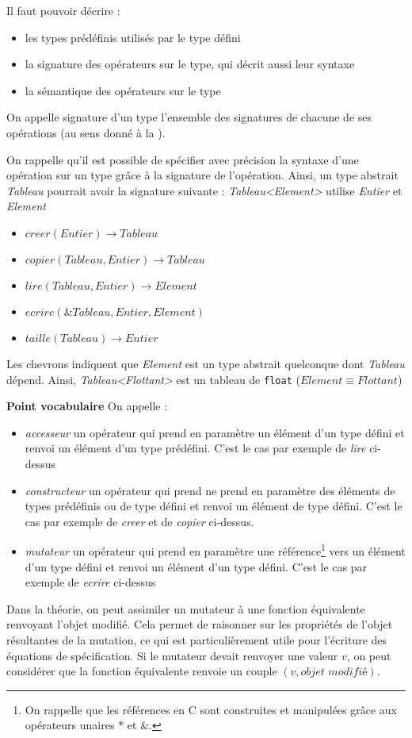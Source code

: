 \documentclass[../../../main.tex]{subfiles}
\begin{document}
Il faut pouvoir décrire :
\begin{itemize}
	\item les types prédéfinis utilisés par le type défini
	\item la signature des opérateurs sur le type, qui décrit aussi leur syntaxe
	\item la sémantique des opérateurs sur le type
\end{itemize}
On appelle signature d'un type l'ensemble des signatures de chacune de ses opérations (au sens donné à la ).

On rappelle qu'il est possible de spécifier avec précision la syntaxe d'une opération sur un type grâce à la signature de l'opération. Ainsi, un type abstrait \textit{Tableau} pourrait avoir la signature suivante :\newline
\textit{Tableau\textless Element\textgreater} utilise \textit{Entier} et \textit{Element}
\begin{itemize}
	\item $creer(Entier) \rightarrow Tableau$
	\item $copier(Tableau, Entier)\rightarrow Tableau$
	\item $lire(Tableau, Entier) \rightarrow Element$
	\item $ecrire(\&Tableau, Entier, Element)$
	\item $taille(Tableau) \rightarrow Entier$
\end{itemize}
Les chevrons indiquent que \textit{Element} est un type abstrait quelconque dont \textit{Tableau} dépend. Ainsi, \textit{Tableau\textless Flottant\textgreater} est un tableau de \texttt{float} ($Element\equiv Flottant$)
\begin{minitelbasicbox}{\textbf{Point vocabulaire}}
On appelle :
\begin{itemize}
	\item \textit{accesseur} un opérateur qui prend en paramètre un élément d'un type défini et renvoi un élément d'un type prédéfini. C'est le cas par exemple de \textit{lire} ci-dessus
	\item \textit{constructeur} un opérateur qui prend ne prend en paramètre des éléments de types prédéfinis ou de type défini et renvoi un élément de type défini. C'est le cas par exemple de \textit{creer} et de \textit{copier} ci-dessus.
	\item \textit{mutateur} un opérateur qui prend en paramètre une référence\footnote{On rappelle que les références en C sont construites et manipulées grâce aux opérateurs unaires $*$ et $\&$.} vers un élément d'un type défini et renvoi un élément d'un type défini. C'est le cas par exemple de \textit{ecrire} ci-dessus
\end{itemize}
Dans la théorie, on peut assimiler un mutateur à une fonction équivalente renvoyant l'objet modifié. Cela permet de raisonner sur les propriétés de l'objet résultantes de la mutation, ce qui est particulièrement utile pour l'écriture des équations de spécification. Si le mutateur devait renvoyer une valeur $v$, on peut considérer que la fonction équivalente renvoie un couple $(v, \textit{objet modifié})$.
\end{minitelbasicbox}
\end{document}
